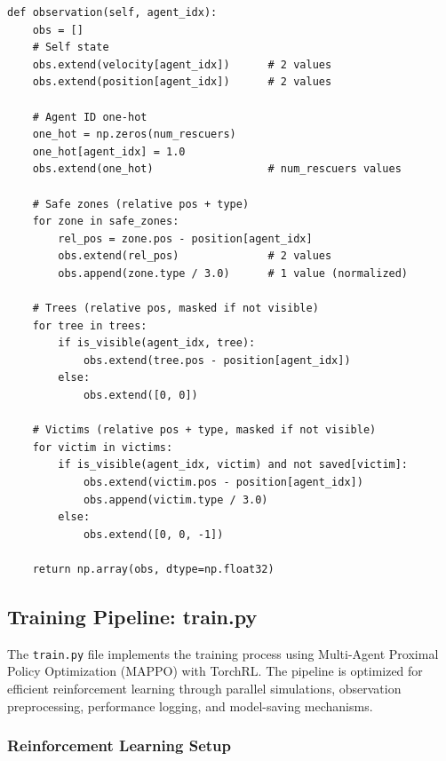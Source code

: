 \documentclass[11pt,a4paper]{article}
\begin{document}
\begin{lstlisting}[caption={Observation construction.},label={lst:observation}]
def observation(self, agent_idx):
    obs = []
    # Self state
    obs.extend(velocity[agent_idx])      # 2 values
    obs.extend(position[agent_idx])      # 2 values

    # Agent ID one-hot
    one_hot = np.zeros(num_rescuers)
    one_hot[agent_idx] = 1.0
    obs.extend(one_hot)                  # num_rescuers values

    # Safe zones (relative pos + type)
    for zone in safe_zones:
        rel_pos = zone.pos - position[agent_idx]
        obs.extend(rel_pos)              # 2 values
        obs.append(zone.type / 3.0)      # 1 value (normalized)

    # Trees (relative pos, masked if not visible)
    for tree in trees:
        if is_visible(agent_idx, tree):
            obs.extend(tree.pos - position[agent_idx])
        else:
            obs.extend([0, 0])

    # Victims (relative pos + type, masked if not visible)
    for victim in victims:
        if is_visible(agent_idx, victim) and not saved[victim]:
            obs.extend(victim.pos - position[agent_idx])
            obs.append(victim.type / 3.0)
        else:
            obs.extend([0, 0, -1])

    return np.array(obs, dtype=np.float32)
\end{lstlisting}

\subsection{Training Pipeline: train.py}
\label{subsec:train_pipeline}

The \texttt{train.py} file implements the training process using Multi-Agent Proximal Policy Optimization (MAPPO) with TorchRL.
The pipeline is optimized for efficient reinforcement learning through parallel simulations, observation preprocessing, performance logging, and model-saving mechanisms.

\subsubsection{Reinforcement Learning Setup}
\label{subsubsec:rl_setup}
\end{document}
